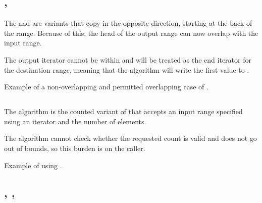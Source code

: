\subsection{\texorpdfstring{, }{\texttt{std::copy\_backward}, \texttt{std::move\_backward}}}

The  and  are variants that copy in the opposite direction, starting at the back of the range. Because of this, the head of the output range can now overlap with the input range.



The output iterator cannot be within \cpp{(first, last]} and will be treated as the end iterator for the destination range, meaning that the algorithm will write the first value to .

\begin{box-note}
\footnotesize Example of a non-overlapping and permitted overlapping case of .
\tcblower
{}
\end{box-note}

\subsection{\texorpdfstring{}{\texttt{std::copy\_n}}}

The  algorithm is the counted variant of  that accepts an input range specified using an iterator and the number of elements.


The algorithm cannot check whether the requested count is valid and does not go out of bounds, so this burden is on the caller.

\begin{box-note}
\footnotesize Example of using .
\tcblower
{}
\end{box-note}

\subsection{\texorpdfstring{, , }{\texttt{std::copy\_if}, \texttt{std::remove\_copy}, \texttt{std::remove\_copy\_if}}}

